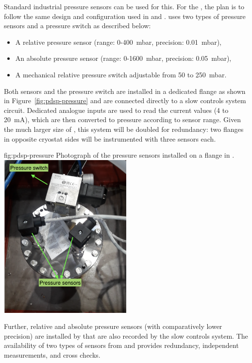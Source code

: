 Standard industrial pressure sensors can be used for this. For the  , the plan is to follow the same design and configuration used in  and .  uses two types of pressure sensors and a pressure switch as described below:
\begin{itemize}
    \item A relative pressure sensor (range: 0-400~mbar, precision: 0.01~mbar),
    \item An absolute pressure sensor (range: 0-1600~mbar, precision: 0.05~mbar),
    \item A mechanical relative pressure switch adjustable from 50 to 250~mbar. 
\end{itemize}


Both sensors and the pressure switch are installed in a dedicated flange as shown in Figure~\ref{fig:pdsp-pressure} and are connected directly to a slow controls system  circuit. Dedicated analogue inputs are used to read the current values (4 to 20~mA), which are then converted to pressure according to sensor range. Given the much larger size of  , this system will be doubled for redundancy: two flanges in opposite cryostat sides will be instrumented with three sensors each. 

\begin{dunefigure}{fig:pdsp-pressure}
  {Photograph of the pressure sensors installed on a flange in .}
  \includegraphics[width=0.5\textwidth]{graphics/cisc-pdsp-pressure-meters}
\end{dunefigure}

Further, relative and absolute pressure sensors (with comparatively lower precision) are installed by  that are also recorded by the slow controls system. The availability of two types of sensors from  and  provides redundancy, independent measurements, and cross checks.

